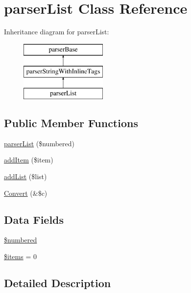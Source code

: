 \hypertarget{classparser_list}{\section{parser\-List \-Class \-Reference}
\label{classparser_list}
}
\-Inheritance diagram for parser\-List\-:\begin{figure}[H]
\begin{center}
\leavevmode
\includegraphics[height=3.000000cm]{classparser_list}
\end{center}
\end{figure}
\subsection*{\-Public \-Member \-Functions}
\begin{DoxyCompactItemize}
\item 
\hyperlink{classparser_list_a68326126bbdea65e629edd40cc7e402f}{parser\-List} (\$numbered)
\item 
\hyperlink{classparser_list_a8dd246975181252a9e2885d83addbad2}{add\-Item} (\$item)
\item 
\hyperlink{classparser_list_a5dc8b90719c014af0dcc6bd46d7ee585}{add\-List} (\$list)
\item 
\hyperlink{classparser_list_ad6c06bea9d11cc1c362b592306cfa707}{\-Convert} (\&\$c)
\end{DoxyCompactItemize}
\subsection*{\-Data \-Fields}
\begin{DoxyCompactItemize}
\item 
\hyperlink{classparser_list_a6fa8a19fdcf0866a6136484631f37e3e}{\$numbered}
\item 
\hyperlink{classparser_list_a737abdef83dabb219182c1e88887c6c3}{\$items} = 0
\end{DoxyCompactItemize}


\subsection{\-Detailed \-Description}


